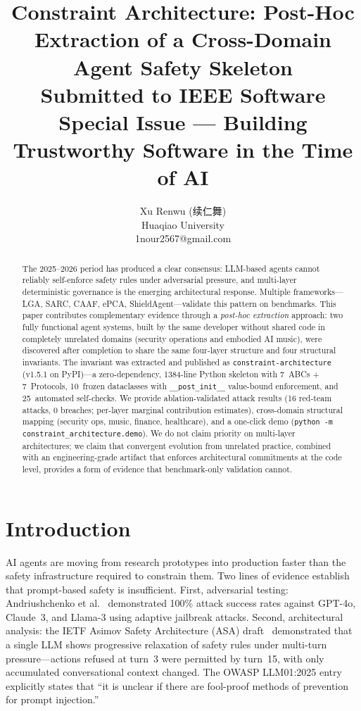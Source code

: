 \documentclass[letterpaper]{article}
\title{Constraint Architecture: Post-Hoc Extraction of a Cross-Domain\\
       Agent Safety Skeleton\\
       {\small Submitted to IEEE Software Special Issue --- Building Trustworthy Software in the Time of AI}}
\author{
  Xu Renwu (续仁舞)\\
  Huaqiao University\\
  1nour2567@gmail.com
}
\begin{document}
\maketitle

\begin{abstract}
The 2025--2026 period has produced a clear consensus: LLM-based agents cannot
reliably self-enforce safety rules under adversarial pressure, and multi-layer
deterministic governance is the emerging architectural response.  Multiple
frameworks---LGA, SARC, CAAF, ePCA, ShieldAgent---validate this pattern on
benchmarks.  This paper contributes complementary evidence through a
\textit{post-hoc extraction} approach: two fully functional agent systems, built
by the same developer without shared code in completely unrelated domains
(security operations and embodied AI music), were discovered after completion to
share the same four-layer structure and four structural invariants.  The
invariant was extracted and published as \texttt{constraint-architecture}
(v1.5.1 on PyPI)---a zero-dependency, 1384-line Python skeleton with 7~ABCs +
7~Protocols, 10~frozen dataclasses with \texttt{\_\_post\_init\_\_} value-bound
enforcement, and 25~automated self-checks.  We provide ablation-validated
attack results (16 red-team attacks, 0 breaches; per-layer marginal contribution
estimates), cross-domain structural mapping (security ops, music, finance,
healthcare), and a one-click demo (\texttt{python -m constraint\_architecture.demo}).
We do not claim priority on multi-layer architectures; we claim that convergent
evolution from unrelated practice, combined with an engineering-grade artifact
that enforces architectural commitments at the code level, provides a form of
evidence that benchmark-only validation cannot.
\end{abstract}

\section{Introduction}

AI agents are moving from research prototypes into production faster than the
safety infrastructure required to constrain them.  Two lines of evidence
establish that prompt-based safety is insufficient.  First, adversarial
testing: Andriushchenko et al.\ \cite{andriushchenko2025} demonstrated 100\%
attack success rates against GPT-4o, Claude~3, and Llama-3 using adaptive
jailbreak attacks.  Second, architectural analysis: the IETF Asimov Safety
Architecture (ASA) draft~\cite{baysal2026} demonstrated that a single LLM
shows progressive relaxation of safety rules under multi-turn pressure---actions
refused at turn~3 were permitted by turn~15, with only accumulated
conversational context changed.  The OWASP LLM01:2025 entry~\cite{owasp2025}
explicitly states that ``it is unclear if there are fool-proof methods of
prevention for prompt injection.''
\end{document}
